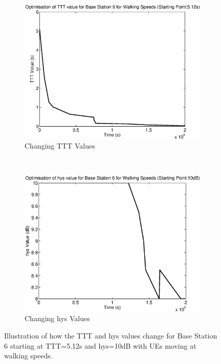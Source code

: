 \begin{figure}[H]
        \centering
        \begin{subfigure}[b]{0.49\textwidth}
                \includegraphics[width=\textwidth]{figures/graphs/walkhigh/TTT6.eps}
                \caption{Changing TTT Values}
        \end{subfigure}%
        ~ %
        \begin{subfigure}[b]{0.49\textwidth}
                \includegraphics[width=\textwidth]{figures/graphs/walkhigh/hys6.eps}
                \caption{Changing hys Values}
        \end{subfigure}
        \caption{Illustration of how the TTT and hys values change for Base Station 6 starting at TTT=5.12s and hys=10dB with UEs moving at walking speeds.}
\end{figure}

